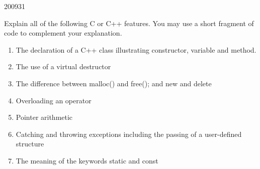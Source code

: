 \documentclass[10pt,\jkfside,a4paper]{article}
\begin{document}
\begin{examquestion}{2009}{3}{1}

Explain all of the following C or C++ features. You may use a short
fragment of code to complement your explanation.

\begin{enumerate}[label=(\alph*)]

\item The declaration of a C++ class illustrating constructor, variable and
method.


\item The use of a virtual destructor


\item The difference between malloc() and free(); and new and delete


\item Overloading an operator


\item Pointer arithmetic


\item Catching and throwing exceptions including the passing of a
user-defined structure


\item The meaning of the keywords static and const


\end{enumerate}

\end{examquestion}
\end{document}

